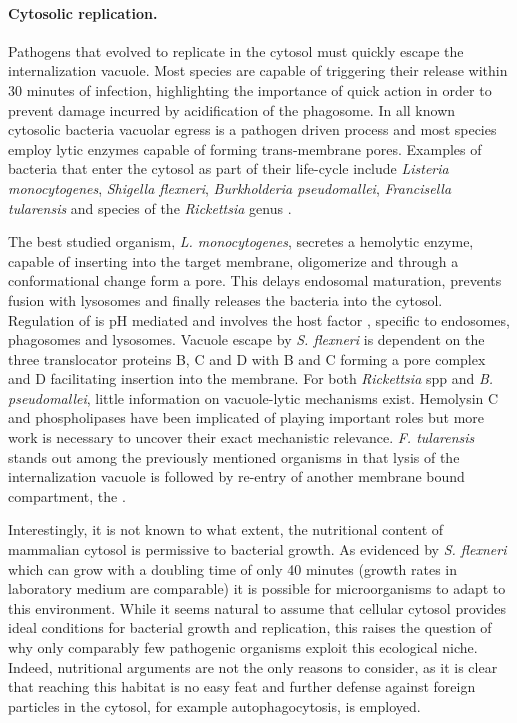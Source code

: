 \paragraph{Cytosolic replication.}
Pathogens that evolved to replicate in the cytosol must quickly escape the internalization vacuole. Most species are capable of triggering their release within 30 minutes of infection, highlighting the importance of quick action in order to prevent damage incurred by acidification of the phagosome. In all known cytosolic bacteria vacuolar egress is a pathogen driven process and most species employ lytic enzymes capable of forming trans-membrane pores. Examples of bacteria that enter the cytosol as part of their life-cycle include \textit{Listeria monocytogenes}, \textit{Shigella flexneri}, \textit{Burkholderia pseudomallei}, \textit{Francisella tularensis} and species of the \textit{Rickettsia} genus \citep{Ray2009}.

The best studied organism, \textit{L. monocytogenes}, secretes  a hemolytic enzyme, capable of inserting into the target membrane, oligomerize and through a conformational change form a pore. This delays endosomal maturation, prevents fusion with lysosomes and finally releases the bacteria into the cytosol. Regulation of  is pH mediated and involves the host factor , specific to endosomes, phagosomes and lysosomes. Vacuole escape by \textit{S. flexneri} is dependent on the three  translocator proteins B, C and D with B and C forming a pore complex and D facilitating insertion into the membrane. For both \textit{Rickettsia} \acrshort{spp} and \textit{B. pseudomallei}, little information on vacuole-lytic mechanisms exist. Hemolysin C and phospholipases have been implicated of playing important roles but more work is necessary to uncover their exact mechanistic relevance. \textit{F. tularensis} stands out among the previously mentioned organisms in that lysis of the internalization vacuole is followed by re-entry of another membrane bound compartment, the .

Interestingly, it is not known to what extent, the nutritional content of mammalian cytosol is permissive to bacterial growth. As evidenced by \textit{S. flexneri} which can grow with a doubling time of only 40 minutes (growth rates in laboratory medium are comparable) it is possible for microorganisms to adapt to this environment. While it seems natural to assume that cellular cytosol provides ideal conditions for bacterial growth and replication, this raises the question of why only comparably few pathogenic organisms exploit this ecological niche. Indeed, nutritional arguments are not the only reasons to consider, as it is clear that reaching this habitat is no easy feat and further defense against foreign particles in the cytosol, for example autophagocytosis, is employed.

